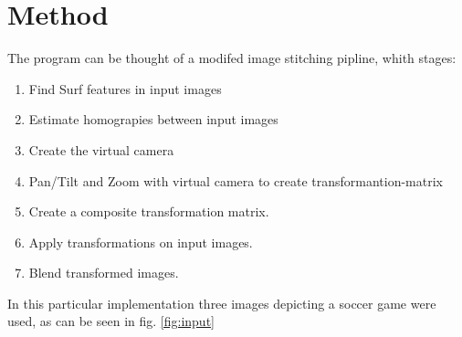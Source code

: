\section{Method}

The program can be thought of a modifed image stitching pipline, whith stages:
\begin{enumerate}
	\item Find Surf features in input images
	\item Estimate homograpies between input images
	\item Create the virtual camera
	\item Pan/Tilt and Zoom with virtual camera to create transformantion-matrix
	\item Create a composite transformation matrix.
	\item Apply transformations on input images.
	\item Blend transformed images.
\end{enumerate}

In this particular implementation three images depicting a soccer game were used, as can be seen in fig. \ref{fig:input}

